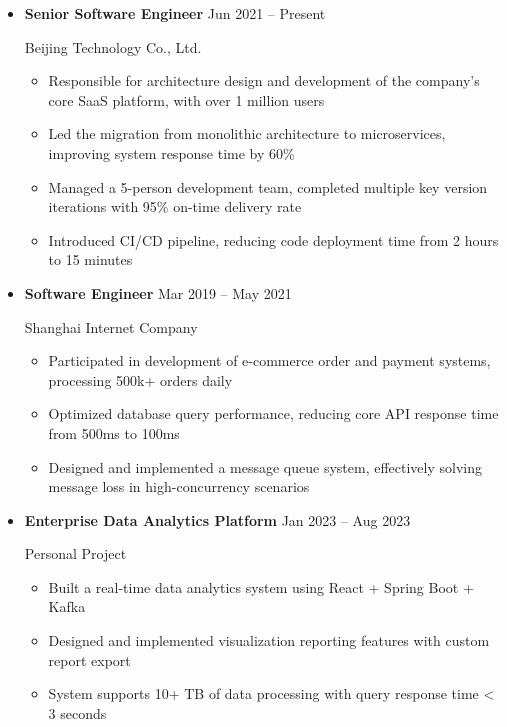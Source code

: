 \documentclass[11pt,a4paper]{article}
\begin{document}
\begin{itemize}
    \item \textbf{Senior Software Engineer} \hfill Jun 2021 -- Present

    \textcolor{primarycolor}{Beijing Technology Co., Ltd.}

    \begin{itemize}
        \item Responsible for architecture design and development of the company's core SaaS platform, with over 1 million users
        \item Led the migration from monolithic architecture to microservices, improving system response time by 60\%
        \item Managed a 5-person development team, completed multiple key version iterations with 95\% on-time delivery rate
        \item Introduced CI/CD pipeline, reducing code deployment time from 2 hours to 15 minutes
    \end{itemize}

    \vspace{0.15em}

    \item \textbf{Software Engineer} \hfill Mar 2019 -- May 2021

    \textcolor{primarycolor}{Shanghai Internet Company}

    \begin{itemize}
        \item Participated in development of e-commerce order and payment systems, processing 500k+ orders daily
        \item Optimized database query performance, reducing core API response time from 500ms to 100ms
        \item Designed and implemented a message queue system, effectively solving message loss in high-concurrency scenarios
    \end{itemize}

    \vspace{0.15em}

    \item \textbf{Enterprise Data Analytics Platform} \hfill Jan 2023 -- Aug 2023

    \textcolor{primarycolor}{Personal Project}

    \begin{itemize}
        \item Built a real-time data analytics system using React + Spring Boot + Kafka
        \item Designed and implemented visualization reporting features with custom report export
        \item System supports 10+ TB of data processing with query response time < 3 seconds
    \end{itemize}


\end{itemize}
\end{document}
